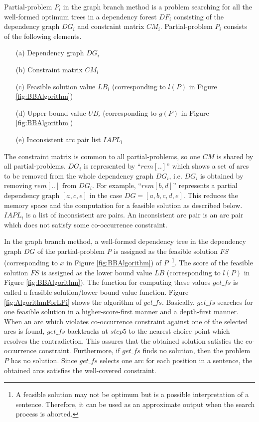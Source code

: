 Partial-problem $P_i$ in the graph branch method is a problem
searching for all the well-formed optimum trees in a dependency forest
$DF_i$ consisting of the dependency graph $DG_i$ and constraint matrix
$CM_i$. Partial-problem $P_i$ consists of the following elements.

\begin{itemize}
\item[(a)] Dependency graph $DG_i$
\item[(b)] Constraint matrix $CM_i$
\item[(c)] Feasible solution value $LB_i$ (corresponding to $l(P)$ in Figure \ref{fig:BBAlgorithm})
\item[(d)] Upper bound value $UB_i$ (corresponding to $g(P)$ in Figure \ref{fig:BBAlgorithm})
\item[(e)] Inconsistent arc pair list $IAPL_i$
\end{itemize}

{\mynoindent}The constraint matrix is common to all partial-problems,
so one $CM$ is shared by all partial-problems. $DG_i$ is represented
by ``$rem[..]$'' which shows a set of arcs to be removed from the
whole dependency graph $DG_i$, i.e. $DG_i$ is obtained by removing
$rem[..]$ from $DG_i$. For example, ``$rem[b,d]$'' represents a
partial dependency graph $[a,c,e]$ in the case $DG=[a,b,c,d,e]$. This
reduces the memory space and the computation for a feasible solution
as described below. $IAPL_i$ is a list of inconsistent arc pairs. An
inconsistent arc pair is an arc pair which does not satisfy some
co-occurrence constraint.

\mygapskip{}

In the graph branch method, a well-formed dependency tree in the
dependency graph $DG$ of the partial-problem $P$ is assigned as the
feasible solution $FS$ (corresponding to $x$ in
Figure \ref{fig:BBAlgorithm}) of $P$~\footnote{A feasible solution may not be
optimum but is a possible interpretation of a sentence. Therefore, it
can be used as an approximate output when the search process is
aborted.}. The score of the feasible solution $FS$ is assigned as the
lower bound value $LB$ (corresponding to $l(P)$ in
Figure \ref{fig:BBAlgorithm}). The function for computing these values
$get\_fs$ is called a feasible solution/lower bound value
function. Figure \ref{fig:AlgorithmForLPi} shows the algorithm of
$get\_fs$. Basically, $get\_fs$ searches for one feasible solution in
a higher-score-first manner and a depth-first manner. When an arc which
violates co-occurrence constraint against one of the selected arcs is found,
$get\_fs$ backtracks at $step5$ to the nearest choice point
which resolves the contradiction. This assures that the obtained
solution satisfies the co-occurrence constraint. Furthermore, if $get\_fs$
finds no solution, then the problem $P$ has no solution. Since
$get\_fs$ selects one arc for each position in a sentence, the obtained
arcs satisfies the well-covered constraint. 

